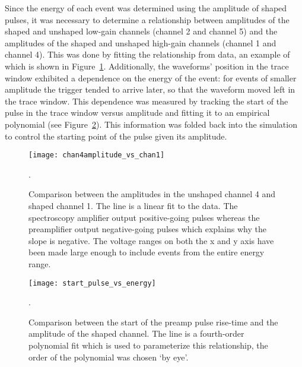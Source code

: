 	Since the energy of each event was determined using the amplitude of shaped pulses, it was necessary to determine a relationship between amplitudes of the shaped and unshaped low-gain channels (channel 2 and channel 5) and the amplitudes of the shaped and unshaped high-gain channels (channel 1 and channel 4).  This was done by fitting the relationship from data, an example of which is shown in Figure~\ref{fig:Risetimechan2vschan4}.  Additionally, the waveforms' position in the trace window exhibited a dependence on the energy of the event: for events of smaller amplitude the trigger tended to arrive later, so that the waveform moved left in the trace window.  This dependence was measured by tracking the start of the pulse in the trace window versus amplitude and fitting it to an empirical polynomial (see Figure~\ref{fig:TriggerPositionDependence}).  This information was folded back into the simulation to control the starting point of the pulse given its amplitude.
	
					\begin{figure}
						\centering
						\texttt{[image: chan4amplitude\_vs\_chan1]}
						\caption[Comparison between the amplitudes in the unshaped and shaped BeGe channels]
						{Comparison between the amplitudes in the unshaped channel 4 and shaped channel 1.  											The line is a linear fit to the data.  The spectroscopy amplifier
						output positive-going pulses whereas the preamplifier output negative-going pulses which explains why the slope 
						is negative.  The voltage ranges on both the x and y axis have been made large enough to include events from the
						entire energy range.}
						\label{fig:Risetimechan2vschan4}.
					\end{figure}
					
					\begin{figure}
						\centering
						\texttt{[image: start\_pulse\_vs\_energy]}
						\caption[Comparison between the start of the preamp pulse rise-time and the amplitude of the shaped channel for the BeGe]
						{Comparison between the start of the preamp pulse rise-time and the amplitude of the shaped
						 channel.  The line is a fourth-order polynomial fit which is used to parameterize this relationship, the order
						 of the polynomial was chosen `by eye'.}
						\label{fig:TriggerPositionDependence}.
					\end{figure}					
	
